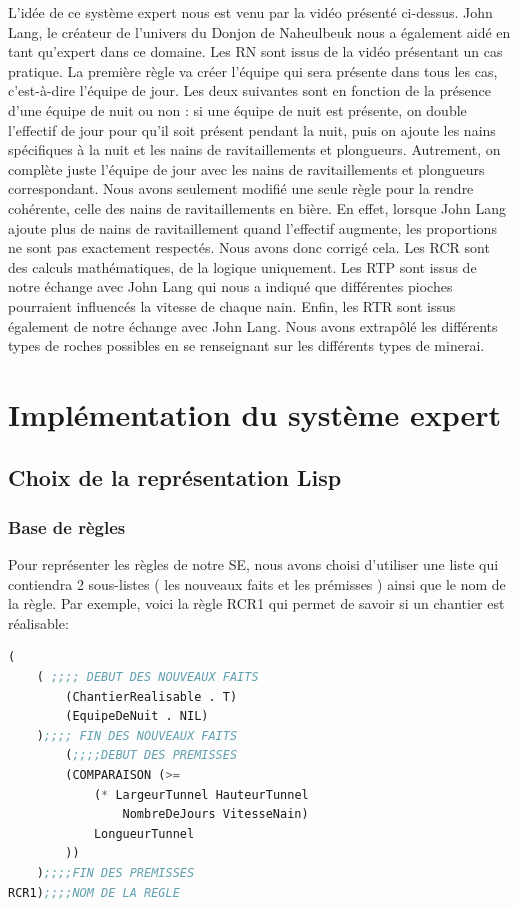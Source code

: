 \documentclass[a4paper,10pt]{report}
\begin{document}
L'idée de ce système expert nous est venu par la vidéo présenté ci-dessus. John Lang, le créateur de l’univers du Donjon de Naheulbeuk nous a également aidé en tant qu'expert dans ce domaine. 
Les RN sont issus de la vidéo présentant un cas pratique. La première règle va créer l'équipe qui sera présente dans tous les cas, c'est-à-dire l'équipe de jour. Les deux suivantes sont en fonction de la présence d'une équipe de nuit ou non : si une équipe de nuit est présente, on double l'effectif de jour pour qu'il soit présent pendant la nuit, puis on ajoute les nains spécifiques à la nuit et les nains de ravitaillements et plongueurs. Autrement, on complète juste l'équipe de jour avec les nains de ravitaillements et plongueurs correspondant.
Nous avons seulement modifié une seule règle pour la rendre cohérente, celle des nains de ravitaillements en bière. En effet, lorsque John Lang ajoute plus de nains de ravitaillement quand l'effectif augmente, les proportions ne sont pas exactement respectés. Nous avons donc corrigé cela.
Les RCR sont des calculs mathématiques, de la logique uniquement.
Les RTP sont issus de notre échange avec John Lang qui nous a indiqué que différentes pioches pourraient influencés la vitesse de chaque nain.
Enfin, les RTR sont issus également de notre échange avec John Lang. Nous avons extrapôlé les différents types de roches possibles en se renseignant sur les différents types de minerai.

\chapter{Implémentation du système expert}
  \section{Choix de la représentation Lisp}
    \subsection{Base de règles}
    Pour représenter les règles de notre SE, nous avons choisi d'utiliser une liste qui contiendra 2 sous-listes ( les nouveaux faits et les prémisses )
    ainsi que le nom de la règle. Par exemple, voici la règle RCR1 qui permet de savoir si un chantier est réalisable:\newline
    \begin{lstlisting}[language=Lisp]
(
	( ;;;; DEBUT DES NOUVEAUX FAITS
		(ChantierRealisable . T)
		(EquipeDeNuit . NIL)
	);;;; FIN DES NOUVEAUX FAITS
		(;;;;DEBUT DES PREMISSES
		(COMPARAISON (>=
			(* LargeurTunnel HauteurTunnel
			    NombreDeJours VitesseNain)
			LongueurTunnel
		))
	);;;;FIN DES PREMISSES
RCR1);;;;NOM DE LA REGLE

    \end{lstlisting}
\end{document}
